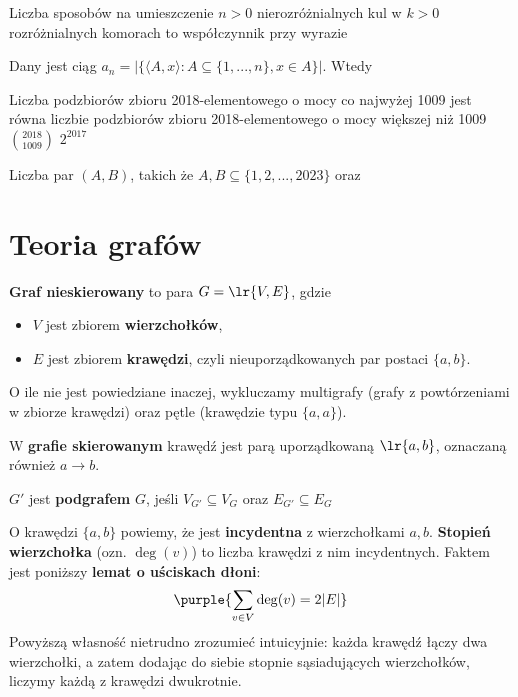 \begin{problems}
    \prob Liczba sposobów na umieszczenie $n > 0$ nierozróżnialnych kul w $k > 0$ rozróżnialnych komorach to współczynnik przy wyrazie

    \prob Dany jest ciąg $a_n = |\{\langle A, x \rangle: A \subseteq \{1, ..., n\}, x \in A\}|$. Wtedy

    \prob Liczba podzbiorów zbioru 2018-elementowego o mocy co najwyżej 1009 jest równa
    \answers
    {liczbie podzbiorów zbioru 2018-elementowego o mocy większej niż 1009}
    {$\binom{2018}{1009}$}
    {$2^{2017}$}

    \prob Liczba par $(A, B)$, takich że $A, B \subseteq \{1, 2, ..., 2023\}$ oraz
\end{problems}

\section{Teoria grafów}

\textbf{Graf nieskierowany} to para $G = \lr{V, E}$, gdzie
\begin{itemize}
    \item $V$ jest zbiorem \textbf{wierzchołków},
    \item $E$ jest zbiorem \textbf{krawędzi}, czyli nieuporządkowanych par postaci $\{a, b\}$.
\end{itemize}

O ile nie jest powiedziane inaczej, wykluczamy multigrafy (grafy z powtórzeniami w zbiorze krawędzi) oraz pętle (krawędzie typu $\{a, a\}$).

W \textbf{grafie skierowanym} krawędź jest parą uporządkowaną $\lr{a, b}$, oznaczaną również $a \to b$.

$G'$ jest \textbf{podgrafem} $G$, jeśli $V_{G'} \subseteq V_G$ oraz $E_{G'} \subseteq E_G$
\bigskip

O krawędzi $\{a, b\}$ powiemy, że jest \textbf{incydentna} z wierzchołkami $a, b$. \textbf{Stopień wierzchołka} (ozn. $\deg(v)$) to liczba krawędzi z nim incydentnych. Faktem jest poniższy \textbf{lemat o uściskach dłoni}:
$$\purple{\sum_{v \in V} \deg(v) = 2|E|}$$
Powyższą własność nietrudno zrozumieć intuicyjnie: każda krawędź łączy dwa wierzchołki, a zatem dodając do siebie stopnie sąsiadujących wierzchołków, liczymy każdą z krawędzi dwukrotnie.

